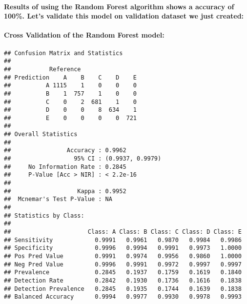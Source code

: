 \documentclass[]{article}
\newenvironment{Shaded}{\begin{snugshade}}{\end{snugshade}}
\newcommand{\KeywordTok}[1]{\textcolor[rgb]{0.13,0.29,0.53}{\textbf{#1}}}
\newcommand{\DecValTok}[1]{\textcolor[rgb]{0.00,0.00,0.81}{#1}}
\newcommand{\StringTok}[1]{\textcolor[rgb]{0.31,0.60,0.02}{#1}}
\newcommand{\OperatorTok}[1]{\textcolor[rgb]{0.81,0.36,0.00}{\textbf{#1}}}
\newcommand{\NormalTok}[1]{#1}
\let\oldparagraph\paragraph
\renewcommand{\paragraph}[1]{\oldparagraph{#1}\mbox{}}
\begin{document}
\begin{Shaded}
\end{Shaded}

\paragraph{Results of using the Random Forest algorithm shows a accuracy
of 100\%. Let's validate this model on validation dataset we just
created:}\label{results-of-using-the-random-forest-algorithm-shows-a-accuracy-of-100.-lets-validate-this-model-on-validation-dataset-we-just-created}

\paragraph{Cross Validation of the Random Forest
model:}\label{cross-validation-of-the-random-forest-model}

\begin{Shaded}
\end{Shaded}

\begin{verbatim}
## Confusion Matrix and Statistics
## 
##           Reference
## Prediction    A    B    C    D    E
##          A 1115    1    0    0    0
##          B    1  757    1    0    0
##          C    0    2  681    1    0
##          D    0    0    8  634    1
##          E    0    0    0    0  721
## 
## Overall Statistics
##                                           
##                Accuracy : 0.9962          
##                  95% CI : (0.9937, 0.9979)
##     No Information Rate : 0.2845          
##     P-Value [Acc > NIR] : < 2.2e-16       
##                                           
##                   Kappa : 0.9952          
##  Mcnemar's Test P-Value : NA              
## 
## Statistics by Class:
## 
##                      Class: A Class: B Class: C Class: D Class: E
## Sensitivity            0.9991   0.9961   0.9870   0.9984   0.9986
## Specificity            0.9996   0.9994   0.9991   0.9973   1.0000
## Pos Pred Value         0.9991   0.9974   0.9956   0.9860   1.0000
## Neg Pred Value         0.9996   0.9991   0.9972   0.9997   0.9997
## Prevalence             0.2845   0.1937   0.1759   0.1619   0.1840
## Detection Rate         0.2842   0.1930   0.1736   0.1616   0.1838
## Detection Prevalence   0.2845   0.1935   0.1744   0.1639   0.1838
## Balanced Accuracy      0.9994   0.9977   0.9930   0.9978   0.9993
\end{verbatim}
\end{document}
